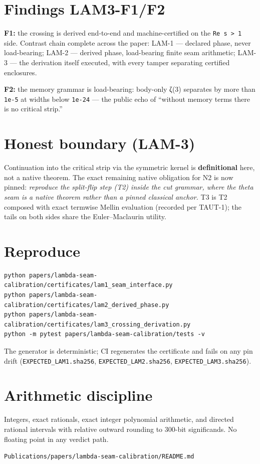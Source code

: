 \hypertarget{findings-lam3-f1f2}{%
\section{Findings LAM3-F1/F2}\label{findings-lam3-f1f2}}

\textbf{F1:} the crossing is derived end-to-end and machine-certified on the
\texttt{Re\ s\ \textgreater{}\ 1} side. Contrast chain complete across the paper:
LAM-1 --- declared phase, never load-bearing; LAM-2 --- derived phase,
load-bearing finite seam arithmetic; LAM-3 --- the derivation itself
executed, with every tamper separating certified enclosures.

\textbf{F2:} the memory grammar is load-bearing: body-only ζ(3) separates by
more than \texttt{1e-5} at widths below \texttt{1e-24} --- the public echo of ``without
memory terms there is no critical strip.''

\hypertarget{honest-boundary-lam-3}{%
\section{Honest boundary (LAM-3)}\label{honest-boundary-lam-3}}

Continuation into the critical strip via the symmetric kernel is
\textbf{definitional} here, not a native theorem. The exact remaining native
obligation for N2 is now pinned: \emph{reproduce the split-flip step (T2)
inside the cut grammar, where the theta seam is a native theorem rather
than a pinned classical anchor.} T3 is T2 composed with exact termwise
Mellin evaluation (recorded per TAUT-1); the tails on both sides share
the Euler--Maclaurin utility.

\hypertarget{reproduce}{%
\section{Reproduce}\label{reproduce}}

\begin{verbatim}
python papers/lambda-seam-calibration/certificates/lam1_seam_interface.py
python papers/lambda-seam-calibration/certificates/lam2_derived_phase.py
python papers/lambda-seam-calibration/certificates/lam3_crossing_derivation.py
python -m pytest papers/lambda-seam-calibration/tests -v
\end{verbatim}

The generator is deterministic; CI regenerates the certificate and
fails on any pin drift (\texttt{EXPECTED\_LAM1.sha256}, \texttt{EXPECTED\_LAM2.sha256}, \texttt{EXPECTED\_LAM3.sha256}).

\hypertarget{arithmetic-discipline}{%
\section{Arithmetic discipline}\label{arithmetic-discipline}}

Integers, exact rationals, exact integer polynomial arithmetic, and
directed rational intervals with relative outward rounding to 300-bit
significands. No floating point in any verdict path.

\begin{flushright}\small\texttt{Publications/papers/lambda-seam-calibration/README.md}\end{flushright}
